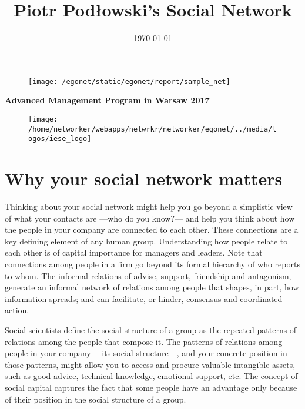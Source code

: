 \documentclass[a4paper,12pt]{article}
\title{\Huge{Piotr Podłowski's Social Network}}
\date{\today}
\begin{document}
\clearpage
\thispagestyle{empty}

\maketitle


\begin{figure}[H]
\centering
\texttt{[image: /egonet/static/egonet/report/sample\_net]}
\end{figure}


\begin{center}
\Large{\textbf{Advanced Management Program in Warsaw 2017}}


\begin{figure}[H]
\centering
\texttt{[image: /home/networker/webapps/netwrkr/networker/egonet/../media/logos/iese\_logo]}
\end{figure}

\small{}
\end{center}

\newpage
\clearpage
{}


\section*{Why your social network matters}


Thinking about your social network might help you go beyond a simplistic view of what your contacts are ---who do you know?--- and help you think about how the people in your company are connected to each other. These connections are a key defining element of any human group. Understanding how people relate to each other is of capital importance for managers and leaders. Note that connections among people in a firm go beyond its formal hierarchy of who reports to whom. The informal relations of advise, support, friendship and antagonism, generate an informal network of relations among people that shapes, in part, how information spreads; and can facilitate, or hinder, consensus and coordinated action.

Social scientists define the social structure of a group as the repeated patterns of relations among the people that compose it. The patterns of relations among people in your company ---its social structure---, and your concrete position in those patterns, might allow you to access and procure valuable intangible assets, such as good advice, technical knowledge, emotional support, etc. The concept of social capital captures the fact that some people have an advantage only because of their position in the social structure of a group.
\end{document}
